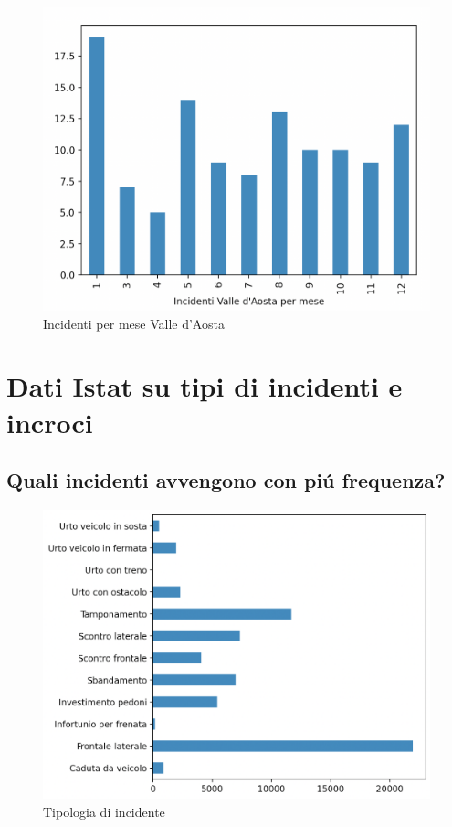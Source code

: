 \documentclass[a4paper]{report}
\begin{document}
\begin{figure}[!ht]
    \includegraphics[width=\linewidth]{../src/incidenti/incidenti_senza_coords/mese_incidenti/valle_aosta.png}
    \caption{Incidenti per mese Valle d'Aosta}
    \label{fig:aosta}
\end{figure}


\newpage
\section{Dati Istat su tipi di incidenti e incroci}

\newpage
\subsection{Quali incidenti avvengono con pi\'u frequenza?}

\begin{figure}[!ht]
    \includegraphics[width=\linewidth]{../src/incidenti/incidenti_senza_coords/localizzazione_incidente/tipo_incidente.png}
    \caption{Tipologia di incidente}
    \label{fig:tipo_incidente}
\end{figure}
\end{document}
